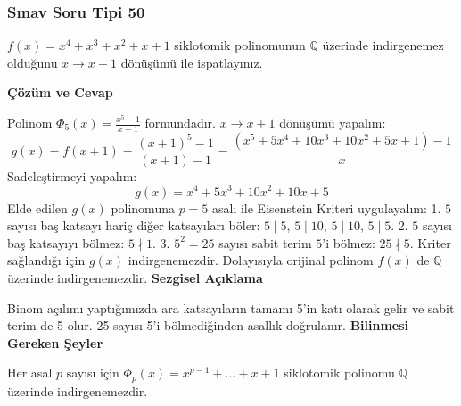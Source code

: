 \documentclass[11pt, a4paper]{article}
\newenvironment{cozum}{
    \vspace{0.5cm}
    \noindent\textcolor{green!60!black}{\faCheckCircle\enspace \textbf{\Large Çözüm ve Cevap}}\par\vspace{0.2cm}
}{}
\newenvironment{sezgisel}{
    \vspace{0.5cm}
    \noindent\textcolor{orange!80!black}{\faLightbulb\enspace \textbf{\Large Sezgisel Açıklama}}\par\vspace{0.2cm}
    \itshape
}{}
\newenvironment{bilgi}{
    \vspace{0.5cm}
    \noindent\textcolor{red!70!black}{\faExclamationTriangle\enspace \textbf{\Large Bilinmesi Gereken Şeyler}}\par\vspace{0.2cm}
}{}
\begin{document}
\subsubsection{Sınav Soru Tipi 50}
\begin{sinavbox}
$f(x) = x^4+x^3+x^2+x+1$ siklotomik polinomunun $\mathbb{Q}$ üzerinde indirgenemez olduğunu $x \to x+1$ dönüşümü ile ispatlayınız.
\end{sinavbox}
\begin{cozum}
Polinom $\Phi_5(x) = \frac{x^5-1}{x-1}$ formundadır. $x \to x+1$ dönüşümü yapalım:
\[ g(x) = f(x+1) = \frac{(x+1)^5-1}{(x+1)-1} = \frac{(x^5 + 5x^4 + 10x^3 + 10x^2 + 5x + 1) - 1}{x} \]
Sadeleştirmeyi yapalım:
\[ g(x) = x^4 + 5x^3 + 10x^2 + 10x + 5 \]
Elde edilen $g(x)$ polinomuna $p=5$ asalı ile Eisenstein Kriteri uygulayalım:
1. $5$ sayısı baş katsayı hariç diğer katsayıları böler:
   $5 \mid 5$, $5 \mid 10$, $5 \mid 10$, $5 \mid 5$.
2. $5$ sayısı baş katsayıyı bölmez: $5 \nmid 1$.
3. $5^2 = 25$ sayısı sabit terim $5$'i bölmez: $25 \nmid 5$.
Kriter sağlandığı için $g(x)$ indirgenemezdir. Dolayısıyla orijinal polinom $f(x)$ de $\mathbb{Q}$ üzerinde indirgenemezdir.
\end{cozum}
\begin{sezgisel}
Binom açılımı yaptığımızda ara katsayıların tamamı 5'in katı olarak gelir ve sabit terim de 5 olur. 25 sayısı 5'i bölmediğinden asallık doğrulanır.
\end{sezgisel}
\begin{bilgi}
Her asal $p$ sayısı için $\Phi_p(x) = x^{p-1} + \dots + x + 1$ siklotomik polinomu $\mathbb{Q}$ üzerinde indirgenemezdir.
\end{bilgi}

\newpage
\end{document}
